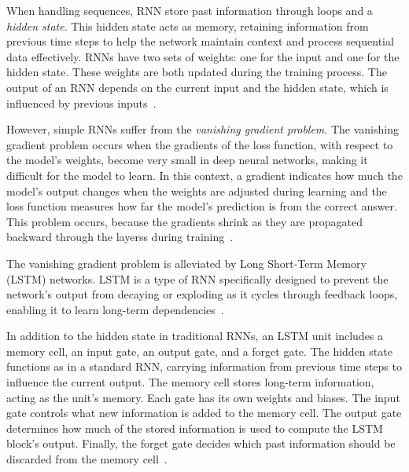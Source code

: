 \documentclass[a4paper,oneside,onecolumn,12pt]{book}
\begin{document}
		When handling sequences, RNN store past information through loops and a \textit{hidden state}. This hidden state acts as memory, retaining information from previous time steps to help the network maintain context and process sequential data effectively. RNNs have two sets of weights: one for the input and one for the hidden state. These weights are both updated during the training process. The output of an RNN depends on the current input and the hidden state, which is influenced by previous inputs~\cite{HLSTMW}.

		However, simple RNNs suffer from the \textit{vanishing gradient problem}. The vanishing gradient problem occurs when the gradients of the loss function, with respect to the model's weights, become very small in deep neural networks, making it difficult for the model to learn. In this context, a gradient indicates how much the model's output changes when the weights are adjusted during learning and the loss function measures how far the model's prediction is from the correct answer. This problem occurs, because the gradients shrink as they are propagated backward through the layerss during training~\cite{VGPCCS}.

		The vanishing gradient problem is alleviated by Long Short-Term Memory (LSTM) networks. LSTM is a type of RNN specifically designed to prevent the network's output from decaying or exploding as it cycles through feedback loops, enabling it to learn long-term dependencies~\cite{LSTM}.

		In addition to the hidden state in traditional RNNs, an LSTM unit includes a memory cell, an input gate, an output gate, and a forget gate. The hidden state functions as in a standard RNN, carrying information from previous time steps to influence the current output. The memory cell stores long-term information, acting as the unit's memory. Each gate has its own weights and biases. The input gate controls what new information is added to the memory cell. The output gate determines how much of the stored information is used to compute the LSTM block’s output. Finally, the forget gate decides which past information should be discarded from the memory cell~\cite{HLSTMW}.
		
\end{document}
